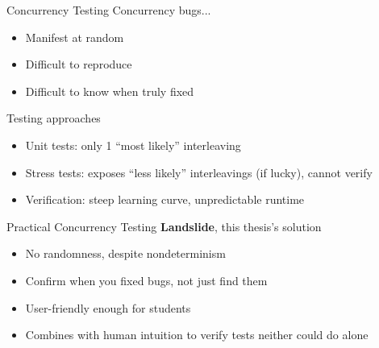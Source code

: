 \documentclass[xcolor=dvipsnames]{beamer}
\begin{document}
\begin{frame}{Concurrency Testing} %
	Concurrency bugs...
	\begin{itemize}
		\item Manifest at random
		\item Difficult to reproduce
		\item Difficult to know when truly fixed %
	\end{itemize}
	\linegap

	Testing approaches
	\begin{itemize}
		\item Unit tests: only 1 ``most likely'' interleaving
		\item Stress tests: exposes ``less likely'' interleavings (if lucky), %
			cannot verify
		\item Verification: steep learning curve, unpredictable runtime
	\end{itemize}
\end{frame}
\begin{frame}{Practical Concurrency Testing}
	\textbf{Landslide}, this thesis's solution
	\begin{itemize}
		\item No randomness, despite nondeterminism
		\item Confirm when you fixed bugs, not just find them %
		\item User-friendly enough for students
		\item Combines with human intuition to verify tests neither could do alone
	\end{itemize}
\end{frame}
\end{document}
